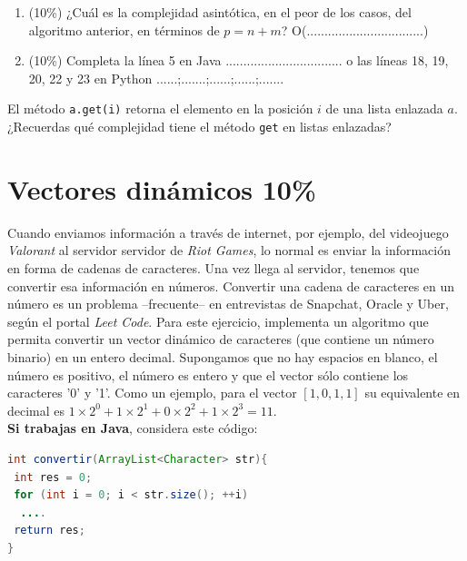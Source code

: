 \documentclass[10 pt]{article}
\begin{document}
\begin{multicols}{2}
\begin{enumerate}[label=\Alph*]
	\item (10\%) ¿Cuál es la complejidad asintótica, en el peor de los casos, del algoritmo anterior, en términos de $p = n+m$?
	O(.................................)
	\item (10\%) Completa la línea 5 en Java ................................. o las líneas 18, 19, 20, 22 y 23 en Python ......;.......;......;......;.......\\
\end{enumerate}

El método \texttt{a.get(i)} retorna el elemento en la posición $i$ de una lista enlazada $a$. ¿Recuerdas qué complejidad tiene el método \texttt{get} en listas
enlazadas?

\section{Vectores dinámicos 10\%}
Cuando enviamos información a través de internet, por ejemplo, del videojuego \textit{Valorant} al servidor servidor de \textit{Riot Games}, lo normal es enviar la información en forma de
cadenas de caracteres. Una vez llega al servidor, tenemos que convertir esa información en números. Convertir una cadena de caracteres en un
número es un problema --frecuente-- en entrevistas de Snapchat, Oracle y Uber, según el portal \textit{Leet Code}. Para este ejercicio, implementa un algoritmo que
permita convertir un vector dinámico de caracteres (que contiene un número binario) en un entero decimal. Supongamos que no hay espacios en blanco, el número es positivo,
el número es entero y que el vector sólo contiene los caracteres '0' y '1'. Como un ejemplo, para el vector $[1,0,1,1]$ su equivalente en decimal es $1\times 2^0 + 1\times 2^1 + 0\times 2^2 + 1\times 2^3 = 11$.\\ 

\textbf{Si trabajas en Java}, considera este código:

{\footnotesize
\begin{lstlisting}[language=Java]
int convertir(ArrayList<Character> str){ 
 int res = 0; 
 for (int i = 0; i < str.size(); ++i) 
  ....
 return res; 
}  
\end{lstlisting}
}


\end{multicols}
\end{document}
